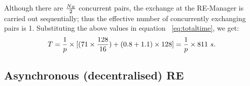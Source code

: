 \documentclass{rspublic}
\newcommand{\alnote}[1]{ {\textcolor{blue} { ***andre: #1 }}}
\newcommand{\athotanote}[1]{ {\textcolor{green} { ***athota: #1 }}}
\newcommand{\alnote}[1]{}
\newcommand{\athotanote}[1]{}
\begin{document}


Although there are $N_R \over 2$ concurrent pairs, the exchange at the
RE-Manager is carried out sequentially; thus the effective number of
concurrently exchanging pairs is 1.  Substituting the above values in
equation ~\ref{eq:totaltime}, we get:
\begin{eqnarray}
T=  {1 \over p} \times {[ {(71\times {128\over 16}}) + (0.8 + 1.1)\times 128]} = {1 \over p} \times 811~s.
\label{eq:cent}
\end{eqnarray}


\subsection{Asynchronous (decentralised) RE}




\end{document}
